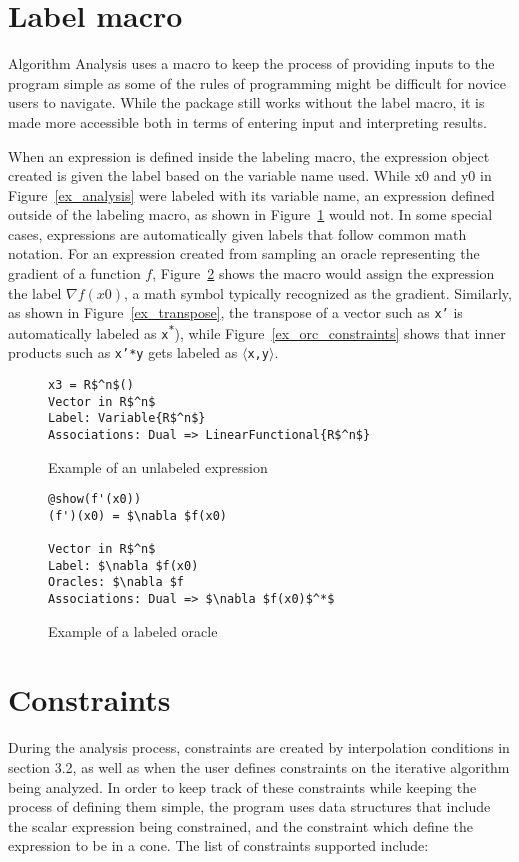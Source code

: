 \section{Label macro}
Algorithm Analysis uses a macro to keep the process of providing inputs to the program simple as some of the rules of programming might be difficult for novice users to navigate. While the package still works without the label macro, it is made more accessible both in terms of entering input and interpreting results.

When an expression is defined inside the labeling macro, the expression object created is given the label based on the variable name used.	While x0 and y0 in Figure~\ref{ex_analysis} were labeled with its variable name, an expression defined outside of the labeling macro, as shown in Figure~\ref{ex_unlabeled} would not. In some special cases, expressions are automatically given labels that follow common math notation. For an expression created from sampling an oracle representing the gradient of a function $f$, Figure~\ref{ex_labeled} shows the macro would assign the expression the label $\nabla f(x0)$, a math symbol typically recognized as the gradient. Similarly, as shown in Figure~\ref{ex_transpose}, the transpose of a vector such as \texttt{x'} is automatically labeled as \texttt{x\textsuperscript{*}}), while Figure~\ref{ex_orc_constraints} shows that inner products such as \texttt{x'*y} gets labeled as \texttt{$\langle$x,y$\rangle$}.

\begin{figure}[!h]
	\begin{lstlisting}[mathescape]
x3 = R$^n$()
Vector in R$^n$
Label: Variable{R$^n$}
Associations: Dual => LinearFunctional{R$^n$}
\end{lstlisting}
\caption{Example of an unlabeled expression}
\label{ex_unlabeled}
\end{figure}

\begin{figure}[!h]
	\begin{lstlisting}[mathescape]
@show(f'(x0))
(f')(x0) = $\nabla $f(x0)

Vector in R$^n$
Label: $\nabla $f(x0)
Oracles: $\nabla $f
Associations: Dual => $\nabla $f(x0)$^*$
	\end{lstlisting}
	\caption{Example of a labeled oracle}
	\label{ex_labeled}
\end{figure}

\section{Constraints}
During the analysis process, constraints are created by interpolation conditions in section 3.2, as well as when the user defines constraints on the iterative algorithm being analyzed. In order to keep track of these constraints while keeping the process of defining them simple, the program uses data structures that include the scalar expression being constrained, and the constraint which define the expression to be in a cone. The list of constraints supported include:

